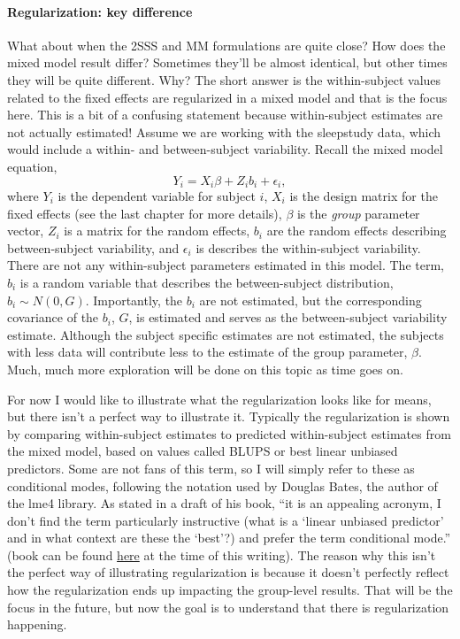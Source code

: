 \documentclass[
]{book}
\begin{document}
\hypertarget{regularization-key-difference}{%
\paragraph{Regularization: key difference}\label{regularization-key-difference}}

What about when the 2SSS and MM formulations are quite close? How does the mixed model result differ? Sometimes they'll be almost identical, but other times they will be quite different. Why? The short answer is the within-subject values related to the fixed effects are regularized in a mixed model and that is the focus here. This is a bit of a confusing statement because within-subject estimates are not actually estimated! Assume we are working with the sleepstudy data, which would include a within- and between-subject variability. Recall the mixed model equation, \[Y_i = X_i\beta + Z_ib_i + \epsilon_i,\] where \(Y_i\) is the dependent variable for subject \(i\), \(X_i\) is the design matrix for the fixed effects (see the last chapter for more details), \(\beta\) is the \emph{group} parameter vector, \(Z_i\) is a matrix for the random effects, \(b_i\) are the random effects describing between-subject variability, and \(\epsilon_i\) is describes the within-subject variability. There are not any within-subject parameters estimated in this model. The term, \(b_i\) is a random variable that describes the between-subject distribution, \(b_i \sim N(0, G)\). Importantly, the \(b_i\) are not estimated, but the corresponding covariance of the \(b_i\), \(G\), is estimated and serves as the between-subject variability estimate. Although the subject specific estimates are not estimated, the subjects with less data will contribute less to the estimate of the group parameter, \(\beta\). Much, much more exploration will be done on this topic as time goes on.

For now I would like to illustrate what the regularization looks like for means, but there isn't a perfect way to illustrate it. Typically the regularization is shown by comparing within-subject estimates to predicted within-subject estimates from the mixed model, based on values called BLUPS or best linear unbiased predictors. Some are not fans of this term, so I will simply refer to these as conditional modes, following the notation used by Douglas Bates, the author of the lme4 library. As stated in a draft of his book, ``it is an appealing acronym, I don't find the term particularly instructive (what is a `linear unbiased predictor' and in what context are these the `best'?) and prefer the term conditional mode.'' (book can be found \href{http://webcom.upmf-grenoble.fr/LIP/Perso/DMuller/M2R/R_et_Mixed/documents/Bates-book.pdf}{here} at the time of this writing). The reason why this isn't the perfect way of illustrating regularization is because it doesn't perfectly reflect how the regularization ends up impacting the group-level results. That will be the focus in the future, but now the goal is to understand that there is regularization happening.
\end{document}
